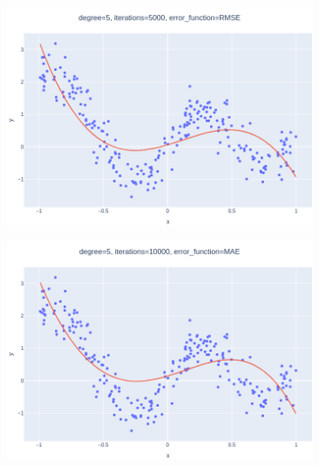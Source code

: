 \documentclass[14pt,a4]{article}
\begin{document}
\begin{figure}[h]
\begin{subfigure}{0.3\linewidth}
        \includegraphics[width=\textwidth]{images/implementation/q1/part_c/5_5000_RMSE.png}
    \end{subfigure}
    \newline
    \begin{subfigure}{0.3\linewidth}
        \centering
        \includegraphics[width=\textwidth]{images/implementation/q1/part_c/5_10000_MAE.png}
    \end{subfigure}
    \hfill
    \begin{subfigure}{0.3\textwidth}
        \centering

\end{subfigure}
\end{figure}
\end{document}
